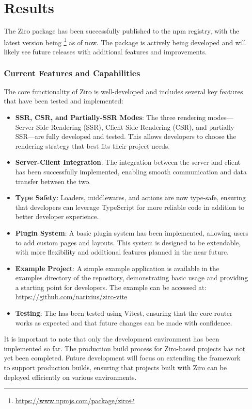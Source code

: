 \section{Results}

The Ziro package has been successfully published to the npm registry, with the latest version being \footnote{\url{https://www.npmjs.com/package/ziro}} as of now. The package is actively being developed and will likely see future releases with additional features and improvements.

\subsubsection*{Current Features and Capabilities}

The core functionality of Ziro is well-developed and includes several key features that have been tested and implemented:

\begin{itemize}
	\item \textbf{SSR, CSR, and Partially-SSR Modes}: The three rendering modes—Server-Side Rendering (SSR), Client-Side Rendering (CSR), and partially-SSR—are fully developed and tested. This allows developers to choose the rendering strategy that best fits their project needs.
	\item \textbf{Server-Client Integration}: The integration between the server and client has been successfully implemented, enabling smooth communication and data transfer between the two.
	\item \textbf{Type Safety}: Loaders, middlewares, and actions are now type-safe, ensuring that developers can leverage TypeScript for more reliable code in addition to better developer experience.
	\item \textbf{Plugin System}: A basic plugin system has been implemented, allowing users to add custom pages and layouts. This system is designed to be extendable, with more flexibility and additional features planned in the near future.
	\item \textbf{Example Project}: A simple example application is available in the examples directory of the repository, demonstrating basic usage and providing a starting point for developers. The example can be accessed at: \url{https://github.com/narixius/ziro-vite}
	\item \textbf{Testing}: The  has been tested using Vitest, ensuring that the core router works as expected and that future changes can be made with confidence.

\end{itemize}

It is important to note that only the development environment has been implemented so far. The production build process for Ziro-based projects has not yet been completed. Future development will focus on extending the framework to support production builds, ensuring that projects built with Ziro can be deployed efficiently on various environments.



\pagebreak
